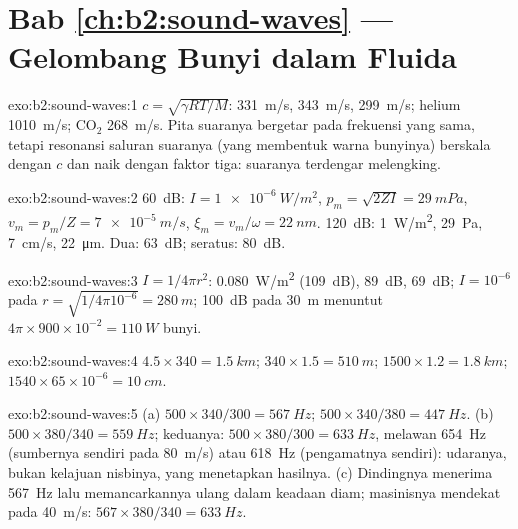 \section*{Bab \ref{ch:b2:sound-waves} --- Gelombang Bunyi dalam Fluida}

\begin{solution}{exo:b2:sound-waves:1}
$c = \sqrt{\gamma RT/M}$: \qty{331}{m/s}, \qty{343}{m/s}, \qty{299}{m/s}; helium
\qty{1010}{m/s}; CO$_2$ \qty{268}{m/s}. Pita suaranya bergetar pada frekuensi
yang sama, tetapi resonansi saluran suaranya (yang membentuk
warna bunyinya) berskala dengan $c$ dan naik dengan faktor tiga: suaranya terdengar
melengking.
\end{solution}

\begin{solution}{exo:b2:sound-waves:2}
\qty{60}{dB}: $I = \qty{1e-6}{W/m^2}$, $p_m = \sqrt{2ZI} = \qty{29}{mPa}$, $v_m = p_m/Z =
\qty{7e-5}{m/s}$, $\xi_m = v_m/\omega = \qty{22}{nm}$. \qty{120}{dB}: \qty{1}{W/m^2},
\qty{29}{Pa}, \qty{7}{cm/s}, \qty{22}{\micro m}. Dua: \qty{63}{dB}; seratus: \qty{80}{dB}.
\end{solution}

\begin{solution}{exo:b2:sound-waves:3}
$I = 1/4\pi r^2$: \qty{0.080}{W/m^2} (\qty{109}{dB}), \qty{89}{dB}, \qty{69}{dB}; $I = 10^{-6}$
pada $r = \sqrt{1/4\pi10^{-6}} = \qty{280}{m}$; \qty{100}{dB} pada \qty{30}{m} menuntut $4\pi \times
900 \times 10^{-2} = \qty{110}{W}$ bunyi.
\end{solution}

\begin{solution}{exo:b2:sound-waves:4}
$4.5 \times 340 = \qty{1.5}{km}$; $340 \times 1.5 = \qty{510}{m}$; $1500 \times 1.2 = \qty{1.8}{km}$;
$1540 \times 65 \times 10^{-6} = \qty{10}{cm}$.
\end{solution}

\begin{solution}{exo:b2:sound-waves:5}
(a) $500 \times 340/300 = \qty{567}{Hz}$; $500 \times 340/380 = \qty{447}{Hz}$. (b) $500 \times
380/340 = \qty{559}{Hz}$; keduanya: $500 \times 380/300 = \qty{633}{Hz}$, melawan \qty{654}{Hz}
(sumbernya sendiri pada \qty{80}{m/s}) atau \qty{618}{Hz} (pengamatnya sendiri): udaranya, bukan
kelajuan nisbinya, yang menetapkan hasilnya. (c) Dindingnya menerima \qty{567}{Hz}
lalu memancarkannya ulang dalam keadaan diam; masinisnya mendekat pada \qty{40}{m/s}: $567 \times
380/340 = \qty{633}{Hz}$.
\end{solution}

